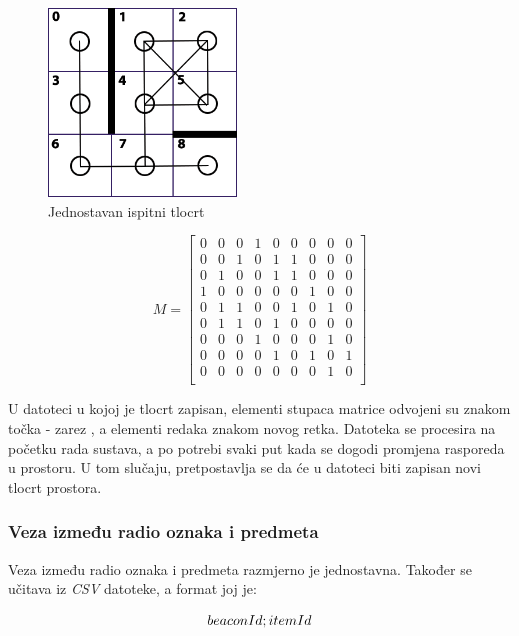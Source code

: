 \documentclass[times, utf8, diplomski, numeric]{fer}
\begin{document}
\begin{figure}[!htb]
	\centering
	\includegraphics[width=5cm]{images/3x3grid.png}
	\caption{Jednostavan ispitni tlocrt}
	\label{fig:layout}
\end{figure}

\begin{equation}
	\label{eq:adjacencyMatrix}
	M = 
	\begin{bmatrix}
		0 & 0 & 0 & 1 & 0 & 0 & 0 & 0 & 0\\
		0 & 0 & 1 & 0 & 1 & 1 & 0 & 0 & 0\\
		0 & 1 & 0 & 0 & 1 & 1 & 0 & 0 & 0\\
		1 & 0 & 0 & 0 & 0 & 0 & 1 & 0 & 0\\
		0 & 1 & 1 & 0 & 0 & 1 & 0 & 1 & 0\\
		0 & 1 & 1 & 0 & 1 & 0 & 0 & 0 & 0\\
		0 & 0 & 0 & 1 & 0 & 0 & 0 & 1 & 0\\
		0 & 0 & 0 & 0 & 1 & 0 & 1 & 0 & 1\\
		0 & 0 & 0 & 0 & 0 & 0 & 0 & 1 & 0\\
	\end{bmatrix}
\end{equation}

U datoteci u kojoj je tlocrt zapisan, elementi stupaca matrice odvojeni su
znakom točka - zarez , a elementi redaka znakom novog retka.
Datoteka se procesira na početku rada sustava, a po potrebi svaki put kada se
dogodi promjena rasporeda u prostoru. U tom slučaju, pretpostavlja se da će u
datoteci biti zapisan novi tlocrt prostora.

\subsubsection{Veza između radio oznaka i predmeta}
Veza između radio oznaka i predmeta razmjerno je jednostavna. Također se učitava
iz \emph{CSV} datoteke, a format joj je:

\begin{equation}
	\centering
	beaconId;itemId
\end{equation}
\end{document}
